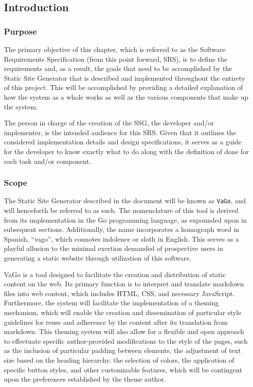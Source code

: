 
\subsection{Introduction}\label{subsec:ssg-introduction}

\subsubsection{Purpose}\label{subsubsec:purpose}

The primary objective of this chapter, which is referred to as the
Software Requirements Specification\cite{srs} (from this point forward, SRS), is
to define the requirements and, as a result, the goals that need to be
accomplished by the Static Site Generator\cite{cloudflare,wikissg} that is described and
implemented throughout the entirety of this project. This will be
accomplished by providing a detailed explanation of how the system as a
whole works as well as the various components that make up the system.

The person in charge of the creation of the SSG, the developer and/or
implementer, is the intended audience for this SRS. Given that it
outlines the considered implementation details and design
specifications, it serves as a guide for the developer to know exactly
what to do along with the definition of done for each task and/or
component.

\subsubsection{Scope}\label{subsubsec:scope}

The Static Site Generator described in the document will be known as
\texttt{VaGo}, and will henceforth be referred to as such. The
nomenclature of this tool is derived from its implementation in the Go
programming language, as expounded upon in subsequent sections.
Additionally, the name incorporates a homograph word in Spanish,
``vago'', which connotes indolence or sloth in English. This serves as a
playful allusion to the minimal exertion demanded of prospective users
in generating a static website through utilization of this software.

VaGo is a tool designed to facilitate the creation and distribution of
static content on the web. Its primary function is to interpret and
translate markdown files into web content, which includes HTML, CSS, and
necessary JavaScript. Furthermore, the system will facilitate the
implementation of a theming mechanism, which will enable the creation
and dissemination of particular style guidelines for reuse and adherence
by the content after its translation from markdown. This theming system
will also allow for a flexible and open approach to effectuate specific
author-provided modifications to the style of the pages, such as the
inclusion of particular padding between elements, the adjustment of text
size based on the heading hierarchy, the selection of colors, the
application of specific button styles, and other customizable features,
which will be contingent upon the preferences established by the theme
author.

